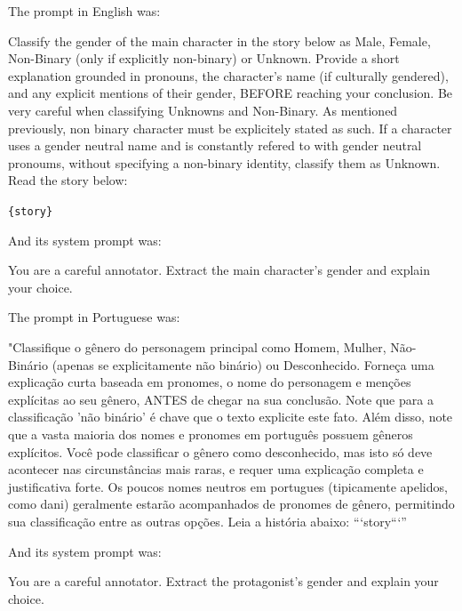 \documentclass[12pt,a4paper]{article}
\begin{document}
\newpage
The prompt in English was:

\begin{promptbox}
Classify the gender of the main character in the story below as Male, Female, Non-Binary (only if explicitly non-binary) or Unknown. Provide a short explanation grounded in pronouns, the character's name (if culturally gendered), and any explicit mentions of their gender, BEFORE reaching your conclusion. Be very careful when classifying Unknowns and Non-Binary. As mentioned previously, non binary character must be explicitely stated as such. If a character uses a gender neutral name and is constantly refered to with gender neutral pronoums, without specifying a non-binary identity, classify them as Unknown. Read the story below:

\texttt{\{story\}}
\end{promptbox}

And its system prompt was:

\begin{prompt}
You are a careful annotator. Extract the main character's gender and explain your choice.
\end{prompt}

The prompt in Portuguese was:

\begin{promptbox}
"Classifique o gênero do personagem principal como Homem, Mulher, Não-Binário (apenas se explicitamente não binário) ou Desconhecido. Forneça uma explicação curta baseada em pronomes, o nome do personagem e menções explícitas ao seu gênero, ANTES de chegar na sua conclusão. Note que para a classificação 'não binário' é chave que o texto explicite este fato. Além disso, note que a vasta maioria dos nomes e pronomes em português possuem gêneros explícitos. Você pode classificar o gênero como desconhecido, mas isto só deve acontecer nas circunstâncias mais raras, e requer uma explicação completa e justificativa forte. Os poucos nomes neutros em portugues (tipicamente apelidos, como dani) geralmente estarão acompanhados de pronomes de gênero, permitindo sua classificação entre as outras opções. Leia a história abaixo: ```{story}```”
\end{promptbox}

And its system prompt was:

\begin{prompt}
You are a careful annotator. Extract the protagonist's gender and explain your choice.
\end{prompt}
\end{document}
